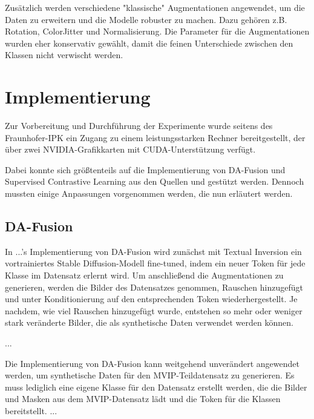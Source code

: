 Zusätzlich werden verschiedene "klassische" Augmentationen angewendet, um die Daten zu erweitern und die Modelle robuster zu machen. Dazu gehören z.B. Rotation, ColorJitter und Normalisierung. Die Parameter für die Augmentationen wurden eher konservativ gewählt, damit die feinen Unterschiede zwischen den Klassen nicht verwischt werden.

\section{Implementierung} \label{sec:implementation}

Zur Vorbereitung und Durchführung der Experimente wurde seitens des Fraunhofer-IPK ein Zugang zu einem leistungsstarken Rechner bereitgestellt, der über zwei NVIDIA-Grafikkarten mit CUDA-Unterstützung verfügt.

Dabei konnte sich größtenteils auf die Implementierung von DA-Fusion und Supervised Contrastive Learning aus den Quellen \parencite{Trabucco2024dafusiongithub} und \parencite{Tian2023supcongithub} gestützt werden. Dennoch mussten einige Anpassungen vorgenommen werden, die nun erläutert werden.

\subsection{DA-Fusion} \label{sec:impl-da-fusion}



In ...'s Implementierung von DA-Fusion wird zunächst mit Textual Inversion ein vortrainiertes Stable Diffusion-Modell fine-tuned, indem ein neuer Token für jede Klasse im Datensatz erlernt wird. Um anschließend die Augmentationen zu generieren, werden die Bilder des Datensatzes genommen, Rauschen hinzugefügt und unter Konditionierung auf den entsprechenden Token wiederhergestellt. Je nachdem, wie viel Rauschen hinzugefügt wurde, entstehen so mehr oder weniger stark veränderte Bilder, die als synthetische Daten verwendet werden können.

...

Die Implementierung von DA-Fusion kann weitgehend unverändert angewendet werden, um synthetische Daten für den MVIP-Teildatensatz zu generieren. Es muss lediglich eine eigene Klasse für den Datensatz erstellt werden, die die Bilder und Masken aus dem MVIP-Datensatz lädt und die Token für die Klassen bereitstellt. ...

